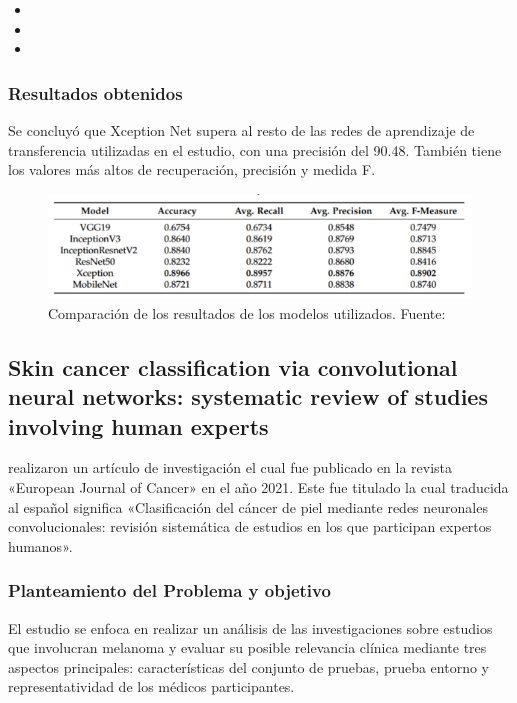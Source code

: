 \begin{itemize}
	\item \TIDLone
	\item \TIDLtwo
	\item \TIDLthree
\end{itemize}


\subsubsection{Resultados obtenidos}
Se concluyó que Xception Net supera al resto de las redes de aprendizaje de transferencia utilizadas en el estudio, con una precisión del 90.48. También tiene los valores más altos de recuperación, precisión y medida F.

\begin{figure}[h]
	\begin{center}
		\includegraphics[width=1\textwidth]{2/figuras/Deep_Learning_Based_Transfer_Learning_imagen_01.png}
		\caption{Comparación de los resultados de los modelos utilizados. Fuente: \cite{jain2021deep}}
		\label{1:fig}
	\end{center}
\end{figure}






\subsection{Skin cancer classification via convolutional neural networks: systematic review of studies involving human experts \citep*{haggenmuller2021skin}}
\citeauthor{haggenmuller2021skin} realizaron un artículo de investigación el cual fue publicado en la revista «European Journal of Cancer» en el año 2021. Este fue titulado  la cual traducida al español significa «Clasificación del cáncer de piel mediante redes neuronales convolucionales: revisión sistemática de estudios en los que participan expertos humanos».

\subsubsection{Planteamiento del Problema y objetivo}
El estudio se enfoca en realizar un análisis de las investigaciones sobre estudios que involucran melanoma y evaluar su posible relevancia clínica mediante tres aspectos principales: características del conjunto de pruebas, prueba entorno y representatividad de los médicos participantes.


